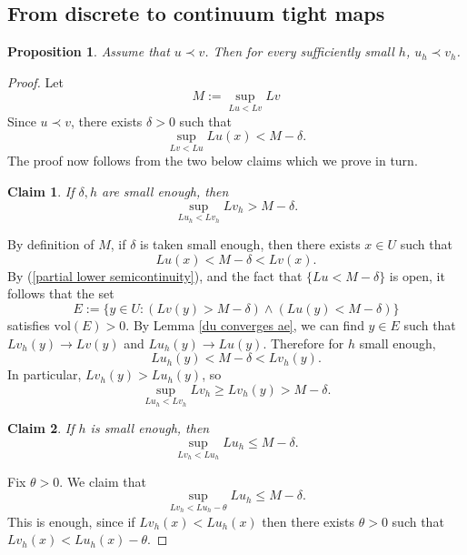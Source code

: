 \documentclass[reqno,11pt]{amsart}
\newcommand{\vol}{\mathrm{vol}}
\newtheorem{proposition}[theorem]{Proposition}
\newtheorem{claim}{Claim}[theorem]
\theoremstyle{definition}
\numberwithin{equation}{section}
\begin{document}
\subsection{From discrete to continuum tight maps}
\begin{proposition}
Assume that $u \prec v$.
Then for every sufficiently small $h$, $u_h \prec v_h$.
\end{proposition}
\begin{proof}
Let 
$$M := \sup_{Lu < Lv} Lv$$
Since $u \prec v$, there exists $\delta > 0$ such that
$$\sup_{Lv < Lu} Lu(x) < M - \delta.$$
The proof now follows from the two below claims which we prove in turn.

\begin{claim}
If $\delta, h$ are small enough, then 
$$\sup_{Lu_h < Lv_h} Lv_h > M - \delta.$$
\end{claim}

By definition of $M$, if $\delta$ is taken small enough, then there exists $x \in U$ such that
$$Lu(x) < M - \delta < Lv(x).$$
By (\ref{partial lower semicontinuity}), and the fact that $\{Lu < M - \delta\}$ is open, it follows that the set
$$E := \{y \in U: (Lv(y) > M - \delta) \wedge (Lu(y) < M - \delta)\}$$
satisfies $\vol(E) > 0$.
By Lemma \ref{du converges ae}, we can find $y \in E$ such that $Lv_h(y) \to Lv(y)$ and $Lu_h(y) \to Lu(y)$.
Therefore for $h$ small enough,
$$Lu_h(y) < M - \delta < Lv_h(y).$$
In particular, $Lv_h(y) > Lu_h(y)$, so 
$$\sup_{Lu_h < Lv_h} Lv_h \geq Lv_h(y) > M - \delta.$$

\begin{claim}
If $h$ is small enough, then 
$$\sup_{Lv_h < Lu_h} Lu_h \leq M - \delta.$$
\end{claim}
Fix $\theta > 0$. We claim that 
\begin{equation}\label{loss of theta}
\sup_{Lv_h < Lu_h - \theta} Lu_h \leq M - \delta.
\end{equation}
This is enough, since if $Lv_h(x) < Lu_h(x)$ then there exists $\theta > 0$ such that $Lv_h(x) < Lu_h(x) - \theta$.


\end{proof}
\end{document}
